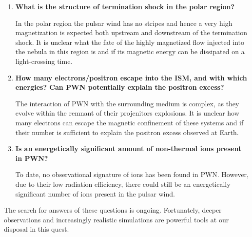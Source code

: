 \begin{enumerate}
\item \textbf{What is the structure of termination shock in the polar region? }

In the polar region the pulsar wind has no stripes and hence a very high magnetization is expected both upstream and downstream of the termination shock. It is unclear what the fate of the highly magnetized flow injected into the nebula in this region is and if its magnetic energy can be dissipated on a light-crossing time.

\item \textbf{How many electrons/positron escape into the ISM, and with which energies? Can PWN potentially explain the positron excess?}

The interaction of PWN with the surrounding medium is complex, as they evolve within the remnant of their projenitors explosions. It is unclear how many electrons can escape the magnetic confinement of these systems and if their number is sufficient to explain the positron excess observed at Earth.

\item \textbf{Is an energetically significant amount of non-thermal ions present in PWN?}

To date, no observational signature of ions has been found in PWN. However, due to their low radiation efficiency, there could still be an energetically significant number of ions present in the pulsar wind.

\end{enumerate}

The search for answers of these questions is ongoing. Fortunately, deeper observations and increasingly realistic simulations are powerful tools at our disposal in this quest.
